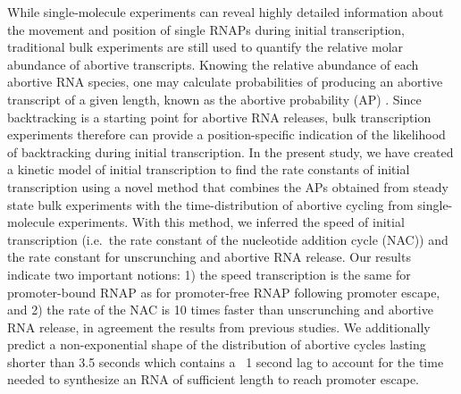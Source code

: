 While single-molecule experiments can reveal highly detailed information
about the movement and position of single RNAPs during initial transcription,
traditional bulk experiments are still used to quantify the relative molar
abundance of abortive transcripts. Knowing the relative abundance of each
abortive RNA species, one may calculate probabilities of producing an
abortive transcript of a given length, known as the abortive probability
(AP) \cite{hsu_promoter_2002, hsu_quantitative_1996}. Since backtracking is a
starting point for abortive RNA releases, bulk transcription experiments
therefore can provide a position-specific indication of the likelihood of
backtracking during initial transcription. In the present study, we have
created a kinetic model of initial transcription to find the rate constants of
initial transcription using a novel method that combines the APs obtained from
steady state bulk experiments with the time-distribution of abortive cycling
from single-molecule experiments. With this method, we inferred the speed of
initial transcription (i.e.\ the rate constant of the nucleotide addition cycle
(NAC)) and the rate constant for unscrunching and abortive RNA release. Our
results indicate two important notions: 1) the speed transcription is the same
for promoter-bound RNAP as for promoter-free RNAP following promoter escape,
and 2) the rate of the NAC is 10 times faster than unscrunching and abortive
RNA release, in agreement the results from previous studies. We additionally
predict a non-exponential shape of the distribution of abortive cycles lasting
shorter than 3.5 seconds which contains a ~1 second lag to account for the time
needed to synthesize an RNA of sufficient length to reach promoter escape.
